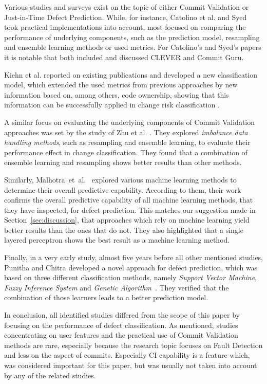 Various studies and surveys exist
on the topic of either Commit Validation or Just-in-Time Defect Prediction. While, for instance, Catolino et al. \cite{Catolino2019} and Syed \cite{Syed2019} took practical implementations into account, most focused on comparing the performance of underlying components, such as the prediction model, resampling and ensemble learning methods or used metrics. For Catolino's and Syed's papers it is notable that both included and discussed CLEVER and Commit Guru.

Kiehn et al. reported on existing publications and developed a new classification model, which extended the used metrics from previous approaches by new information based on, among others, code ownership, showing that this information can be successfully applied in change risk classification \cite{Kiehn2019}.

A similar focus on evaluating the underlying components of Commit Validation approaches was set by the study of Zhu et al. \cite{Zhu2018}. They explored \textit{imbalance data handling methods}, such as resampling and ensemble learning, to evaluate their performance effect in change classification. They found that a combination of ensemble learning and resampling shows better results than other methods. 

Similarly, Malhotra~et~al.~\cite{Malhotra2017} explored various machine learning methods to determine their overall predictive capability. According to them, their work confirms the overall predictive capability of all machine learning methods, that they have inspected, for defect prediction. This matches our suggestion made in Section~\ref{sec:discussion}, that approaches which rely on machine learning yield better results than the ones that do not. They also highlighted that a single layered perceptron shows the best result as a machine learning method.

Finally, in a very early study, almost five years before all other mentioned studies, Punitha and Chitra developed a novel approach for defect prediction, which was based on three different classification methods, namely \textit{Support Vector Machine}, \textit{Fuzzy Inference System} and \textit{Genetic Algorithm}~\cite{Punitha2013}. They verified that the combination of those learners leads to a better prediction model.

In conclusion, all identified studies differed from the scope of this paper by focusing on the performance of defect classification. As mentioned, studies concentrating on user features and the practical use of Commit Validation methods are rare, especially because the research topic focuses on Fault Detection and less on the aspect of commits. Especially CI capability is a feature which, was considered important for this paper, but was usually not taken into account by any of the related studies.

